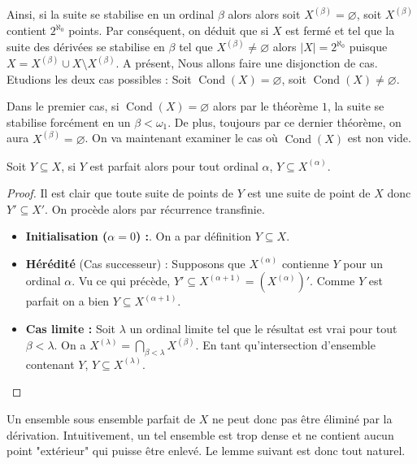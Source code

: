 Ainsi, si la suite se stabilise en un ordinal $\beta$ alors alors soit $X^{(\beta)}= \varnothing$, soit $X^{(\beta)}$ contient $2^{\aleph_0}$ points. Par conséquent, on déduit que si $X$ est fermé et tel que la suite des dérivées se stabilise en $\beta$ tel que $X^{(\beta)}\neq \varnothing$ alors $|X|= 2^{\aleph_0}$ puisque $X= X^{(\beta)}\cup X\setminus X^{(\beta)}$. A présent, Nous allons faire une disjonction de cas. Etudions les deux cas possibles : Soit $\operatorname{Cond}(X)= \varnothing$, soit $\operatorname{Cond}(X)\neq \varnothing$.\par
\medskip
\noindent Dans le premier cas, si $\operatorname{Cond}(X)= \varnothing $ alors par le théorème $1$, la suite se stabilise forcément en un $\beta <\omega_1$. De plus, toujours par ce dernier théorème, on aura $X^{(\beta)}= \varnothing$. On va maintenant examiner le cas où $\operatorname{Cond}(X)$ est non vide.

\begin{lemme}
    Soit $Y\subseteq X$, si $Y$ est parfait alors pour tout ordinal $\alpha$, $Y\subseteq X^{(\alpha)}$.
\end{lemme}

\begin{proof}
    Il est clair que toute suite de points de $Y$ est une suite de point de $X$ donc $Y'\subseteq X'$. On procède alors par récurrence transfinie.
    \begin{itemize}[label=\textbullet]
    \item \textbf{Initialisation ($\alpha = 0$) :}. On a par définition $Y\subseteq X$.
    
    \item \textbf{Hérédité} (Cas successeur) : Supposons que $X^{(\alpha)}$ contienne $Y$ pour un ordinal $\alpha$. Vu ce qui précède, $Y'\subseteq X^{(\alpha+1)}= (X^{(\alpha)})'$. Comme $Y$ est parfait on a bien $Y\subseteq  X^{(\alpha+1)}$.
    
    \item \textbf{Cas limite :} Soit $\lambda$ un ordinal limite tel que le résultat est vrai pour tout $\beta < \lambda$. On a $X^{(\lambda)} = \bigcap_{\beta < \lambda} X^{(\beta)}$. En tant qu'intersection d'ensemble contenant $Y$, $Y\subseteq X^{(\lambda)}$. 
\end{itemize}
\end{proof}
Un ensemble sous ensemble parfait de $X$ ne peut donc pas être éliminé par la dérivation. Intuitivement, un tel ensemble est trop dense et ne contient aucun point "extérieur" qui puisse être enlevé. Le lemme suivant est donc tout naturel.

